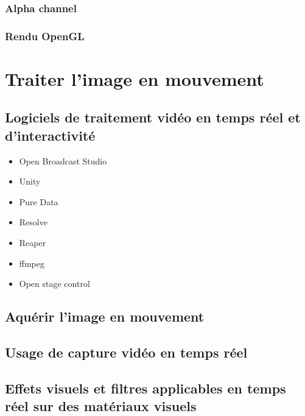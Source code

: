 \documentclass[
]{book}
\providecommand{\tightlist}{%
  \setlength{\itemsep}{0pt}\setlength{\parskip}{0pt}}
\begin{document}
\hypertarget{alpha-channel}{%
\subsection{Alpha channel}\label{alpha-channel}}

\hypertarget{rendu-opengl}{%
\subsection{Rendu OpenGL}\label{rendu-opengl}}

\hypertarget{traiter}{%
\chapter{Traiter l'image en mouvement}\label{traiter}}

\hypertarget{logiciels_de_traitement_video_temps_reel}{%
\section{Logiciels de traitement vidéo en temps réel et d'interactivité}\label{logiciels_de_traitement_video_temps_reel}}

\begin{itemize}
\tightlist
\item
  Open Broadcast Studio
\item
  Unity
\item
  Pure Data
\item
  Resolve
\item
  Reaper
\item
  ffmpeg
\item
  Open stage control
\end{itemize}

\hypertarget{aquuxe9rir-limage-en-mouvement}{%
\section{Aquérir l'image en mouvement}\label{aquuxe9rir-limage-en-mouvement}}

\hypertarget{usage-de-capture-viduxe9o-en-temps-ruxe9el}{%
\section{Usage de capture vidéo en temps réel}\label{usage-de-capture-viduxe9o-en-temps-ruxe9el}}

\hypertarget{effets-visuels-et-filtres-applicables-en-temps-ruxe9el-sur-des-matuxe9riaux-visuels}{%
\section{Effets visuels et filtres applicables en temps réel sur des matériaux visuels}\label{effets-visuels-et-filtres-applicables-en-temps-ruxe9el-sur-des-matuxe9riaux-visuels}}
\end{document}
